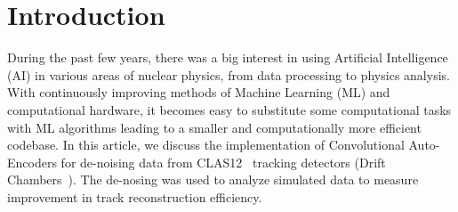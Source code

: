 \section{Introduction}

During the past few years, there was a big interest in using Artificial Intelligence (AI) in 
various areas of nuclear physics, from data processing to physics analysis. With continuously 
improving methods of Machine Learning (ML) and computational hardware, it becomes easy to 
substitute some computational tasks with ML algorithms leading to a smaller and computationally
more efficient codebase. In this article, we discuss the implementation of Convolutional Auto-Encoders 
for de-noising data from CLAS12~\cite{Burkert:2020akg} tracking detectors (Drift 
Chambers~\cite{Mestayer:2020saf}). The de-nosing was used to analyze simulated data to measure
improvement in track reconstruction efficiency.
